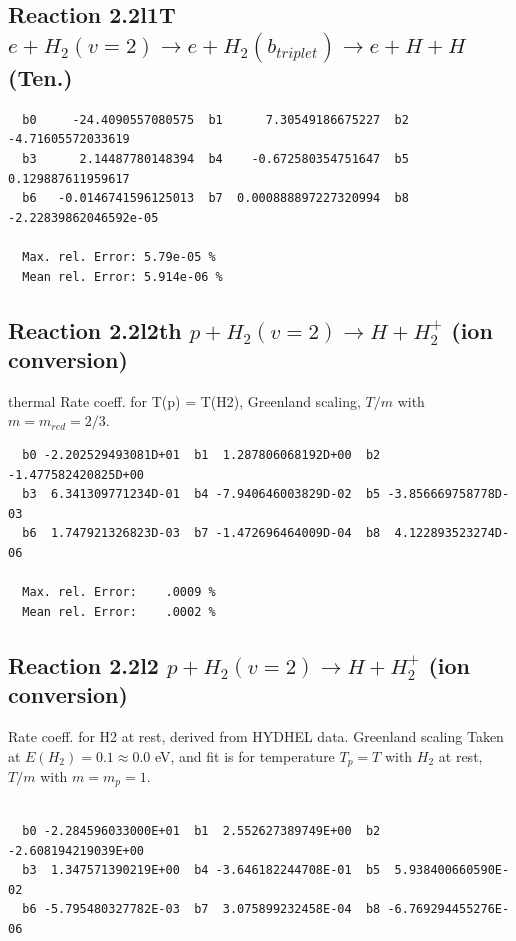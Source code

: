 \documentclass[12pt,dvipdfmx]{article}
\begin{document}
\subsection{
Reaction 2.2l1T
$ e +  H_2(v=2) \rightarrow e + H_2(b_{triplet})\rightarrow e + H + H $ (Ten.)
}


\begin{small}\begin{verbatim}
  b0     -24.4090557080575  b1      7.30549186675227  b2     -4.71605572033619
  b3      2.14487780148394  b4    -0.672580354751647  b5     0.129887611959617
  b6   -0.0146741596125013  b7  0.000888897227320994  b8 -2.22839862046592e-05

  Max. rel. Error: 5.79e-05 %
  Mean rel. Error: 5.914e-06 %
\end{verbatim}\end{small}


\subsection{
Reaction 2.2l2th
$ p + H_2(v=2) \rightarrow H + H_2^+$ (ion conversion)
}
thermal Rate coeff. for T(p) = T(H2), Greenland scaling,
$T/m$ with $m=m_{red}=2/3$.

\begin{small}\begin{verbatim}
  b0 -2.202529493081D+01  b1  1.287806068192D+00  b2 -1.477582420825D+00
  b3  6.341309771234D-01  b4 -7.940646003829D-02  b5 -3.856669758778D-03
  b6  1.747921326823D-03  b7 -1.472696464009D-04  b8  4.122893523274D-06

  Max. rel. Error:    .0009 %
  Mean rel. Error:    .0002 %
\end{verbatim}\end{small}

\subsection{
Reaction 2.2l2
$ p + H_2(v=2) \rightarrow H + H_2^+$ (ion conversion)
}
Rate coeff. for H2 at rest, derived from HYDHEL data. Greenland scaling
Taken at $E(H_2) = 0.1 \approx 0.0$ eV,  and fit is for temperature $T_p=T$ with $H_2$ at rest,
$T/m$ with $m=m_p=1$.


\begin{small}\begin{verbatim}

  b0 -2.284596033000E+01  b1  2.552627389749E+00  b2 -2.608194219039E+00
  b3  1.347571390219E+00  b4 -3.646182244708E-01  b5  5.938400660590E-02
  b6 -5.795480327782E-03  b7  3.075899232458E-04  b8 -6.769294455276E-06

\end{verbatim}\end{small}
\end{document}
